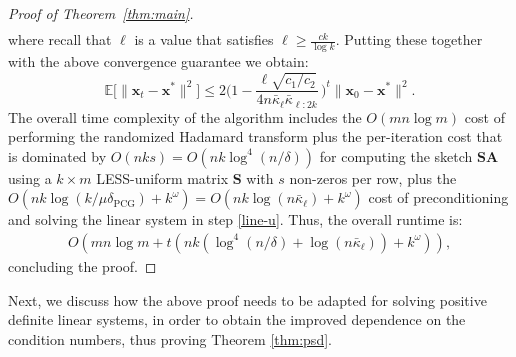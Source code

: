\documentclass[11pt]{article}
\def\x{{\mathbf x}}
\def\A{{\mathbf A}}
\def\S{{\mathbf S}}
\def\E{{\mathds E}}
\begin{document}
\begin{proof}[Proof of Theorem~\ref{thm:main}]
\begin{align*}
\end{align*}
where recall that $\ell$ is a value that satisfies $\ell\geq \frac{ck}{\log k}$. Putting these together with the above convergence guarantee we obtain:
    $$
     \E\big[\|\x_t-\x^*\|^2\big]\leq 2\bigg(1- \frac{\ell\sqrt{c_1/c_2}}{4n\bar\kappa_{\ell}\bar\kappa_{\ell:2k}}\,\bigg)^t\|\x_0-\x^*\|^2.$$
The overall time complexity of the algorithm includes the $O(mn\log m)$ cost of performing the randomized Hadamard transform plus the per-iteration cost that is dominated by $O(nks)=O(nk\log^4(n/\delta))$ for computing  the sketch $\S\A$ using a $k\times m$ LESS-uniform matrix $\S$ with $s$ non-zeros per row, plus the $O(nk\log(k/\mu\delta_{\mathrm{PCG}})+k^\omega)=O(nk\log(n\bar\kappa_\ell)+k^\omega)$ cost of preconditioning and solving the linear system in step \ref{line-u}. Thus, the overall runtime is:
\begin{align*}
    O(mn\log m + t(nk(\log^4(n/\delta)+\log(n\bar\kappa_\ell))+k^\omega)),
\end{align*}
concluding the proof.
\end{proof}

\smallskip

\noindent
Next, we discuss how the above proof needs to be adapted for solving positive definite linear systems, in order to obtain the improved dependence on the condition numbers, thus proving Theorem \ref{thm:psd}.
\end{document}
